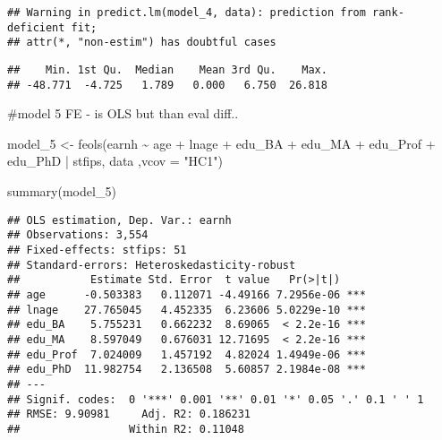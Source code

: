 \documentclass[
]{article}
\newenvironment{Shaded}{\begin{snugshade}}{\end{snugshade}}
\newcommand{\AttributeTok}[1]{\textcolor[rgb]{0.77,0.63,0.00}{#1}}
\newcommand{\FunctionTok}[1]{\textcolor[rgb]{0.00,0.00,0.00}{#1}}
\newcommand{\NormalTok}[1]{#1}
\newcommand{\OtherTok}[1]{\textcolor[rgb]{0.56,0.35,0.01}{#1}}
\newcommand{\SpecialCharTok}[1]{\textcolor[rgb]{0.00,0.00,0.00}{#1}}
\newcommand{\StringTok}[1]{\textcolor[rgb]{0.31,0.60,0.02}{#1}}
\begin{document}
\begin{verbatim}
## Warning in predict.lm(model_4, data): prediction from rank-deficient fit;
## attr(*, "non-estim") has doubtful cases
\end{verbatim}

\begin{Shaded}
\end{Shaded}

\begin{verbatim}
##    Min. 1st Qu.  Median    Mean 3rd Qu.    Max. 
## -48.771  -4.725   1.789   0.000   6.750  26.818
\end{verbatim}

\#model 5 FE - is OLS but than eval diff..

\begin{Shaded}
\begin{Highlighting}[]
\NormalTok{model\_5 }\OtherTok{\textless{}{-}} \FunctionTok{feols}\NormalTok{(earnh }\SpecialCharTok{\textasciitilde{}}\NormalTok{ age  }\SpecialCharTok{+}\NormalTok{ lnage }\SpecialCharTok{+}\NormalTok{ edu\_BA }\SpecialCharTok{+}\NormalTok{ edu\_MA }\SpecialCharTok{+}\NormalTok{ edu\_Prof }\SpecialCharTok{+}\NormalTok{ edu\_PhD }\SpecialCharTok{|}\NormalTok{ stfips, data ,}\AttributeTok{vcov =} \StringTok{"HC1"}\NormalTok{)}

\FunctionTok{summary}\NormalTok{(model\_5)}
\end{Highlighting}
\end{Shaded}

\begin{verbatim}
## OLS estimation, Dep. Var.: earnh
## Observations: 3,554 
## Fixed-effects: stfips: 51
## Standard-errors: Heteroskedasticity-robust 
##           Estimate Std. Error  t value   Pr(>|t|)    
## age      -0.503383   0.112071 -4.49166 7.2956e-06 ***
## lnage    27.765045   4.452335  6.23606 5.0229e-10 ***
## edu_BA    5.755231   0.662232  8.69065  < 2.2e-16 ***
## edu_MA    8.597049   0.676031 12.71695  < 2.2e-16 ***
## edu_Prof  7.024009   1.457192  4.82024 1.4949e-06 ***
## edu_PhD  11.982754   2.136508  5.60857 2.1984e-08 ***
## ---
## Signif. codes:  0 '***' 0.001 '**' 0.01 '*' 0.05 '.' 0.1 ' ' 1
## RMSE: 9.90981     Adj. R2: 0.186231
##                 Within R2: 0.11048
\end{verbatim}
\end{document}
